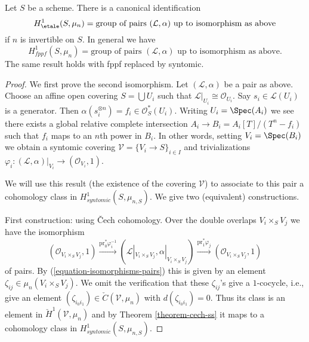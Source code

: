 \begin{lemma}
\label{lemma-describe-h1-mun}
Let $S$ be a scheme. There is a canonical identification
$$
H_\etale^1(S, \mu_n) =
\text{group of pairs }(\mathcal{L}, \alpha)\text{ up to isomorphism as above}
$$
if $n$ is invertible on $S$. In general we have
$$
H_{fppf}^1(S, \mu_n) =
\text{group of pairs }(\mathcal{L}, \alpha)\text{ up to isomorphism as above}.
$$
The same result holds with fppf replaced by syntomic.
\end{lemma}

\begin{proof}
We first prove the second isomorphism.
Let $(\mathcal{L}, \alpha)$ be a pair as above.
Choose an affine open covering $S = \bigcup U_i$ such that
$\mathcal{L}|_{U_i} \cong \mathcal{O}_{U_i}$. Say $s_i \in \mathcal{L}(U_i)$
is a generator. Then $\alpha(s_i^{\otimes n}) = f_i \in \mathcal{O}_S^*(U_i)$.
Writing $U_i = \Spec(A_i)$ we see there exists a global
relative complete intersection $A_i \to B_i = A_i[T]/(T^n - f_i)$
such that $f_i$ maps to an $n$th power in $B_i$. In other words, setting
$V_i = \Spec(B_i)$ we obtain a syntomic covering
$\mathcal{V} = \{V_i \to S\}_{i \in I}$ and trivializations
$\varphi_i : (\mathcal{L}, \alpha)|_{V_i} \to (\mathcal{O}_{V_i}, 1)$.

\medskip\noindent
We will use this result (the existence of the covering $\mathcal{V}$)
to associate to this pair a cohomology class in
$H^1_{syntomic}(S, \mu_{n, S})$. We give two (equivalent) constructions.

\medskip\noindent
First construction: using {\v C}ech cohomology.
Over the double overlaps $V_i \times_S V_j$ we have the isomorphism
$$
(\mathcal{O}_{V_i \times_S V_j}, 1)
\xrightarrow{\text{pr}_0^*\varphi_i^{-1}}
(\mathcal{L}|_{V_i \times_S V_j}, \alpha|_{V_i \times_S V_j})
\xrightarrow{\text{pr}_1^*\varphi_j}
(\mathcal{O}_{V_i \times_S V_j}, 1)
$$
of pairs. By (\ref{equation-isomorphisms-pairs}) this is given by an
element $\zeta_{ij} \in \mu_n(V_i \times_S V_j)$. We omit the verification
that these $\zeta_{ij}$'s give a $1$-cocycle, i.e., give
an element $(\zeta_{i_0i_1}) \in \check C(\mathcal{V}, \mu_n)$
with $d(\zeta_{i_0i_1}) = 0$. Thus its class is an element in
$\check H^1(\mathcal{V}, \mu_n)$ and by
Theorem \ref{theorem-cech-ss}
it maps to a cohomology class in $H^1_{syntomic}(S, \mu_{n, S})$.


\end{proof}
